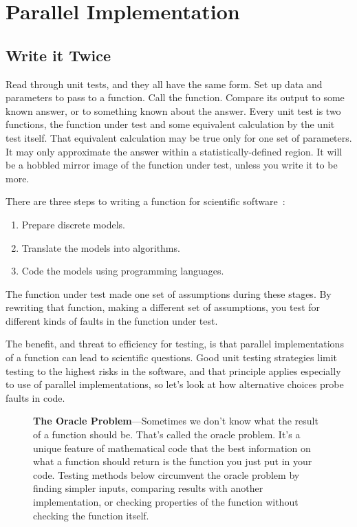 \documentclass[fleqn,10pt]{olplainarticle}
\newenvironment{callout}
{
\begin{figure}
\begin{center}
\begin{minipage}{0.9\textwidth}
\begin{framed}
}
{
\end{framed}
\end{minipage}
\end{center}
\end{figure}
}
\begin{document}
\section{Parallel Implementation}\label{sec:parallel-implementation}
\subsection{Write it Twice}
Read through unit tests, and they all have the same form.
Set up data and parameters to pass to a function. Call the
function. Compare its output to some known answer, or to
something known about the answer. Every unit test is two
functions, the function under test and some equivalent
calculation by the unit test itself. That equivalent calculation
may be true only for one set of parameters. It may only
approximate the answer within a statistically-defined region.
It will be a hobbled mirror image of the function under test,
unless you write it to be more.

There are three steps to writing a function for scientific software~\citep{dahlgren2005}:
\begin{enumerate}
  \item Prepare discrete models.
  \item Translate the models into algorithms.
  \item Code the models using programming languages.
\end{enumerate}
The function under test made one set of assumptions during
these stages. By rewriting that function, making a different
set of assumptions, you test for different kinds of faults
in the function under test.

The benefit, and threat to efficiency for testing, is that
parallel implementations of a function can lead to scientific
questions. Good unit testing strategies limit testing to the
highest risks in the software, and that principle applies
especially to use of parallel implementations, so let's
look at how alternative choices probe faults in code.

\begin{callout}
\textbf{The Oracle Problem}---Sometimes
we don't know what the result of a function should be. That's called
the oracle problem. It's a unique feature of mathematical code that
the best information on what a function should return is the function you just
put in your code. Testing methods below circumvent the oracle problem
by finding simpler inputs, comparing results with another implementation,
or checking properties of the function without checking the function itself.
\end{callout}
\end{document}
